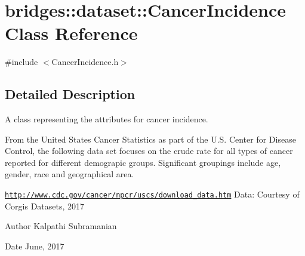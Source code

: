 \hypertarget{classbridges_1_1dataset_1_1_cancer_incidence}{}\section{bridges\+:\+:dataset\+:\+:Cancer\+Incidence Class Reference}
\label{classbridges_1_1dataset_1_1_cancer_incidence}


{\ttfamily \#include $<$Cancer\+Incidence.\+h$>$}



\subsection{Detailed Description}
A class representing the attributes for cancer incidence. 

From the United States Cancer Statistics as part of the U.\+S. Center for Disease Control, the following data set focuses on the crude rate for all types of cancer reported for different demograpic groups. Significant groupings include age, gender, race and geographical area.

\href{http://www.cdc.gov/cancer/npcr/uscs/download_data.htm}{\tt http\+://www.\+cdc.\+gov/cancer/npcr/uscs/download\+\_\+data.\+htm} Data\+: Courtesy of Corgis Datasets, 2017

\begin{DoxyAuthor}{Author}
Kalpathi Subramanian 
\end{DoxyAuthor}
\begin{DoxyDate}{Date}
June, 2017 
\end{DoxyDate}

